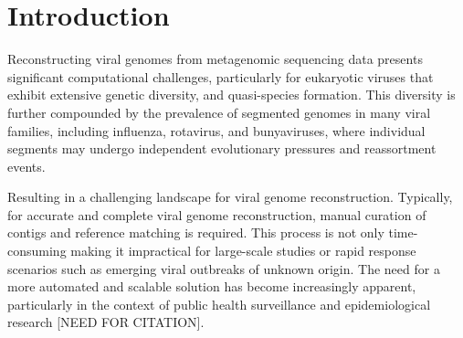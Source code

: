 \documentclass[unnumsec,webpdf,contemporary,large]{oup-authoring-template}%
\theoremstyle{thmstyleone}%
\theoremstyle{thmstyletwo}%
\theoremstyle{thmstylethree}%
\begin{document}
\section{Introduction}\label{sec1}

Reconstructing viral genomes from metagenomic sequencing data presents significant computational challenges, particularly for eukaryotic viruses that exhibit extensive genetic diversity, and quasi-species formation. This diversity is further compounded by the prevalence of segmented genomes in many viral families, including influenza, rotavirus, and bunyaviruses, where individual segments may undergo independent evolutionary pressures and reassortment events.

Resulting in a challenging landscape for viral genome reconstruction. Typically, for accurate and complete viral genome reconstruction, manual curation of contigs and reference matching is required. This process is not only time-consuming making it impractical for large-scale studies or rapid response scenarios such as emerging viral outbreaks of unknown origin. The need for a more automated and scalable solution has become increasingly apparent, particularly in the context of public health surveillance and epidemiological research [NEED FOR CITATION].


\end{document}
